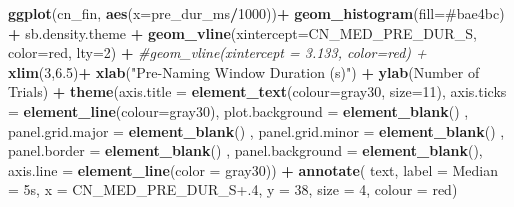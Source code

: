 \documentclass[
  doc,floatsintext]{apa6}
\newenvironment{Shaded}{\begin{snugshade}}{\end{snugshade}}
\newcommand{\AttributeTok}[1]{\textcolor[rgb]{0.13,0.29,0.53}{#1}}
\newcommand{\CommentTok}[1]{\textcolor[rgb]{0.56,0.35,0.01}{\textit{#1}}}
\newcommand{\DecValTok}[1]{\textcolor[rgb]{0.00,0.00,0.81}{#1}}
\newcommand{\FloatTok}[1]{\textcolor[rgb]{0.00,0.00,0.81}{#1}}
\newcommand{\FunctionTok}[1]{\textcolor[rgb]{0.13,0.29,0.53}{\textbf{#1}}}
\newcommand{\NormalTok}[1]{#1}
\newcommand{\SpecialCharTok}[1]{\textcolor[rgb]{0.81,0.36,0.00}{\textbf{#1}}}
\newcommand{\StringTok}[1]{\textcolor[rgb]{0.31,0.60,0.02}{#1}}
\begin{document}
\begin{Shaded}
\begin{Highlighting}[]
\FunctionTok{ggplot}\NormalTok{(cn\_fin, }\FunctionTok{aes}\NormalTok{(}\AttributeTok{x=}\NormalTok{pre\_dur\_ms}\SpecialCharTok{/}\DecValTok{1000}\NormalTok{))}\SpecialCharTok{+}
  \FunctionTok{geom\_histogram}\NormalTok{(}\AttributeTok{fill=}\StringTok{\textquotesingle{}\#bae4bc\textquotesingle{}}\NormalTok{) }\SpecialCharTok{+}
\NormalTok{  sb.density.theme }\SpecialCharTok{+}
  \FunctionTok{geom\_vline}\NormalTok{(}\AttributeTok{xintercept=}\NormalTok{CN\_MED\_PRE\_DUR\_S, }\AttributeTok{color=}\StringTok{\textquotesingle{}red\textquotesingle{}}\NormalTok{, }\AttributeTok{lty=}\DecValTok{2}\NormalTok{) }\SpecialCharTok{+}
  \CommentTok{\#geom\_vline(xintercept = 3.133, color=\textquotesingle{}red\textquotesingle{}) +}
  \FunctionTok{xlim}\NormalTok{(}\DecValTok{3}\NormalTok{,}\FloatTok{6.5}\NormalTok{)}\SpecialCharTok{+}
  \FunctionTok{xlab}\NormalTok{(}\StringTok{"\textquotesingle{}Pre{-}Naming\textquotesingle{} Window Duration (s)"}\NormalTok{) }\SpecialCharTok{+}
  \FunctionTok{ylab}\NormalTok{(}\StringTok{\textquotesingle{}Number of Trials\textquotesingle{}}\NormalTok{) }\SpecialCharTok{+} 
  \FunctionTok{theme}\NormalTok{(}\AttributeTok{axis.title =} \FunctionTok{element\_text}\NormalTok{(}\AttributeTok{colour=}\StringTok{\textquotesingle{}gray30\textquotesingle{}}\NormalTok{, }\AttributeTok{size=}\DecValTok{11}\NormalTok{),}
        \AttributeTok{axis.ticks =} \FunctionTok{element\_line}\NormalTok{(}\AttributeTok{colour=}\StringTok{\textquotesingle{}gray30\textquotesingle{}}\NormalTok{),}
        \AttributeTok{plot.background =} \FunctionTok{element\_blank}\NormalTok{() ,}
        \AttributeTok{panel.grid.major =} \FunctionTok{element\_blank}\NormalTok{() ,}
        \AttributeTok{panel.grid.minor =} \FunctionTok{element\_blank}\NormalTok{() ,}
        \AttributeTok{panel.border =} \FunctionTok{element\_blank}\NormalTok{() ,}
        \AttributeTok{panel.background =} \FunctionTok{element\_blank}\NormalTok{(),}
        \AttributeTok{axis.line =} \FunctionTok{element\_line}\NormalTok{(}\AttributeTok{color =} \StringTok{\textquotesingle{}gray30\textquotesingle{}}\NormalTok{)) }\SpecialCharTok{+}
  \FunctionTok{annotate}\NormalTok{(}
    \StringTok{\textquotesingle{}text\textquotesingle{}}\NormalTok{, }\AttributeTok{label =} \StringTok{\textquotesingle{}Median = 5s\textquotesingle{}}\NormalTok{,}
    \AttributeTok{x =}\NormalTok{ CN\_MED\_PRE\_DUR\_S}\FloatTok{+.4}\NormalTok{, }\AttributeTok{y =} \DecValTok{38}\NormalTok{, }\AttributeTok{size =} \DecValTok{4}\NormalTok{, }\AttributeTok{colour =} \StringTok{\textquotesingle{}red\textquotesingle{}}\NormalTok{)}
\end{Highlighting}
\end{Shaded}
\end{document}
